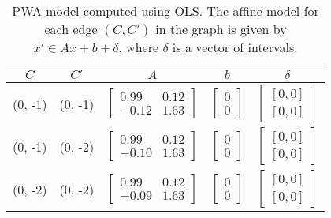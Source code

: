 



\begin{table}[h]
\centering
\caption{PWA model computed using OLS. The affine model for each edge $(C,C')$ in the graph  is given by $x'\in Ax + b + \delta$, where $\delta$ is a vector of intervals.}
\label{tab:vdp-pwa}
\begin{tabular}{@{}ccccc@{}}
\toprule
$C$ & $C'$ & $A$ & $b$ & $\delta$\\
\midrule
(0, -1)   & (0, -1)   & $\begin{bmatrix}0.99& 0.12 \\-0.12&1.63\end{bmatrix}$&$\begin{bmatrix}0\\0\end{bmatrix}  $&$\begin{bmatrix}[0, 0]\\ [0, 0]\end{bmatrix}$\\
(0, -1)   & (0, -2)   & $\begin{bmatrix}0.99& 0.12 \\-0.10&1.63\end{bmatrix}$&$\begin{bmatrix}0\\0\end{bmatrix}  $&$\begin{bmatrix}[0, 0]\\ [0, 0]\end{bmatrix}$\\
\midrule
(0, -2)   & (0, -2)   & $\begin{bmatrix}0.99& 0.12 \\-0.09&1.63\end{bmatrix}$&$\begin{bmatrix}0\\0\end{bmatrix}  $&$\begin{bmatrix}[0, 0]\\ [0, 0]\end{bmatrix}$\\

\end{tabular}
\end{table}
